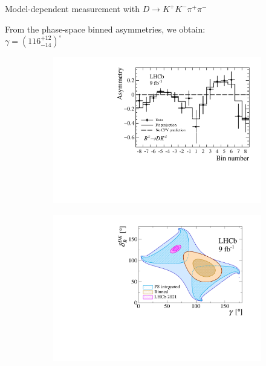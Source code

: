 \documentclass[xcolor={dvipsnames}]{beamer}
\begin{document}
\begin{frame}{Model-dependent measurement with $D\to K^+K^-\pi^+\pi^-$}
  \begin{center}
    \large From the phase-space binned asymmetries, we obtain:\\
    \vspace{0.2cm}
    $\gamma = (116^{+12}_{-14})^\circ$
  \end{center}
  \vspace{-0.2cm}
  \begin{figure}[htb]
    \centering
    \begin{subfigure}{0.5\textwidth}
      \includegraphics[width=1\textwidth]{Plots/BinAsymmetries_dk_ModelDependent.pdf}
    \end{subfigure}%
    \begin{subfigure}{0.5\textwidth}
      \includegraphics[width=1\textwidth]{Plots/gammacharm_lhcb_KKpipi_GLW_KKpipi_GGSZ_lhcb_2020_beauty_and_charm_g_d_dk_ModelDependent.pdf}

\end{subfigure}
\end{figure}
\end{frame}
\end{document}
